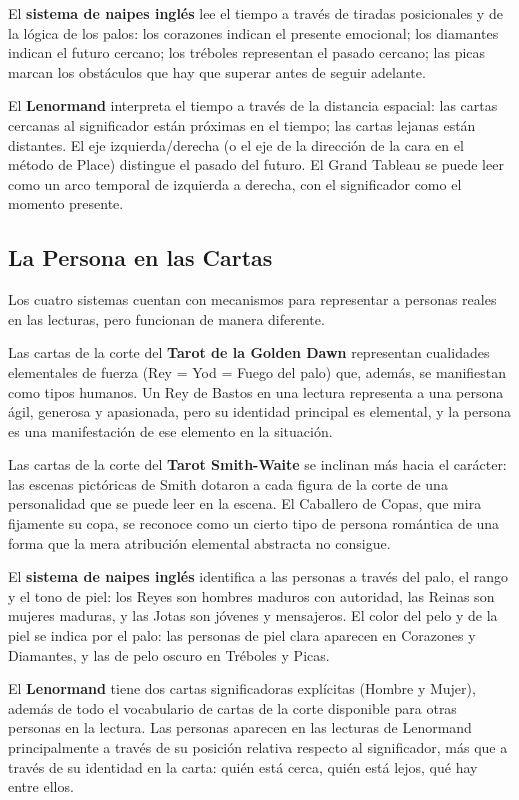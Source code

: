 El \textbf{sistema de naipes inglés} lee el tiempo a través de tiradas posicionales y de la lógica de los palos: los corazones indican el presente emocional; los diamantes indican el futuro cercano; los tréboles representan el pasado cercano; las picas marcan los obstáculos que hay que superar antes de seguir adelante.

El \textbf{Lenormand} interpreta el tiempo a través de la distancia espacial: las cartas cercanas al significador están próximas en el tiempo; las cartas lejanas están distantes. El eje izquierda/derecha (o el eje de la dirección de la cara en el método de Place) distingue el pasado del futuro. El Grand Tableau se puede leer como un arco temporal de izquierda a derecha, con el significador como el momento presente.

\subsection{La Persona en las Cartas}\label{the-person-in-the-cards}

Los cuatro sistemas cuentan con mecanismos para representar a personas reales en las lecturas, pero funcionan de manera diferente.

Las cartas de la corte del \textbf{Tarot de la Golden Dawn} representan cualidades elementales de fuerza (Rey = Yod = Fuego del palo) que, además, se manifiestan como tipos humanos. Un Rey de Bastos en una lectura representa a una persona ágil, generosa y apasionada, pero su identidad principal es elemental, y la persona es una manifestación de ese elemento en la situación.

Las cartas de la corte del \textbf{Tarot Smith-Waite} se inclinan más hacia el carácter: las escenas pictóricas de Smith dotaron a cada figura de la corte de una personalidad que se puede leer en la escena. El Caballero de Copas, que mira fijamente su copa, se reconoce como un cierto tipo de persona romántica de una forma que la mera atribución elemental abstracta no consigue.

El \textbf{sistema de naipes inglés} identifica a las personas a través del palo, el rango y el tono de piel: los Reyes son hombres maduros con autoridad, las Reinas son mujeres maduras, y las Jotas son jóvenes y mensajeros. El color del pelo y de la piel se indica por el palo: las personas de piel clara aparecen en Corazones y Diamantes, y las de pelo oscuro en Tréboles y Picas.

El \textbf{Lenormand} tiene dos cartas significadoras explícitas (Hombre y Mujer), además de todo el vocabulario de cartas de la corte disponible para otras personas en la lectura. Las personas aparecen en las lecturas de Lenormand principalmente a través de su posición relativa respecto al significador, más que a través de su identidad en la carta: quién está cerca, quién está lejos, qué hay entre ellos.

